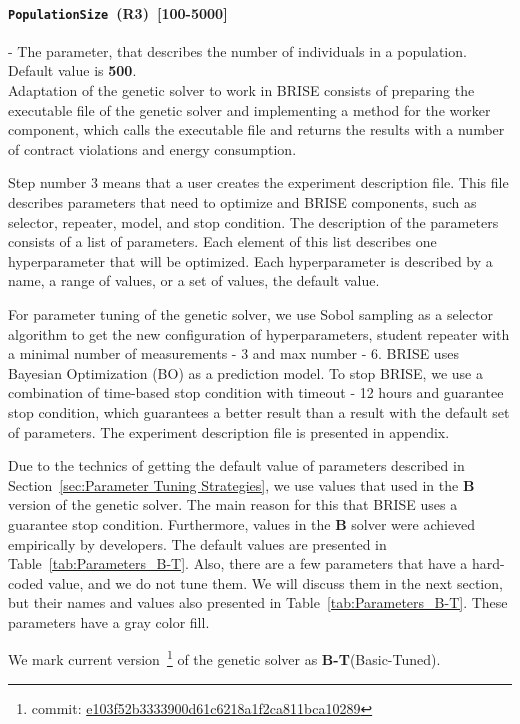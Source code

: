 \paragraph{\texttt{PopulationSize}~(R3)~[100-5000]} - The parameter, that describes the number of individuals in a population. Default value is \textbf{500}. \\

Adaptation of the genetic solver to work in BRISE consists of preparing the executable file of the genetic solver and implementing a method for the worker component, which calls the executable file and returns the results with a number of contract violations and energy consumption.

Step number 3 means that a user creates the experiment description file. This file describes parameters that need to optimize and BRISE components, such as selector, repeater, model, and stop condition. The description of the parameters consists of a list of parameters. Each element of this list describes one hyperparameter that will be optimized. Each hyperparameter is described by a name, a range of values, or a set of values, the default value.

For parameter tuning of the genetic solver, we use Sobol sampling as a selector algorithm to get the new configuration of hyperparameters, student repeater with a minimal number of measurements - 3 and max number - 6. BRISE uses Bayesian Optimization (BO) as a prediction model.
To stop BRISE, we use a combination of time-based stop condition with timeout - 12 hours and guarantee stop condition, which guarantees a better result than a result with the default set of parameters. The experiment description file is presented in appendix.

Due to the technics of getting the default value of parameters described in Section~\ref{sec:Parameter Tuning Strategies}, we use values that used in the \textbf{B} version of the genetic solver. The main reason for this that BRISE uses a guarantee stop condition. Furthermore, values in the \textbf{B} solver were achieved empirically by developers. The default values are presented in Table~\ref{tab:Parameters_B-T}. Also, there are a few parameters that have a hard-coded value, and we do not tune them. We will discuss them in the next section, but their names and values also presented in Table~\ref{tab:Parameters_B-T}. These parameters have a gray color fill. 

We mark current version~\footnote{commit: \href{https://git-st.inf.tu-dresden.de/mquat/mquat2/commit/e103f52b3333900d61c6218a1f2ca811bca10289}{e103f52b3333900d61c6218a1f2ca811bca10289}} of the genetic solver as \textbf{B-T}(Basic-Tuned).



